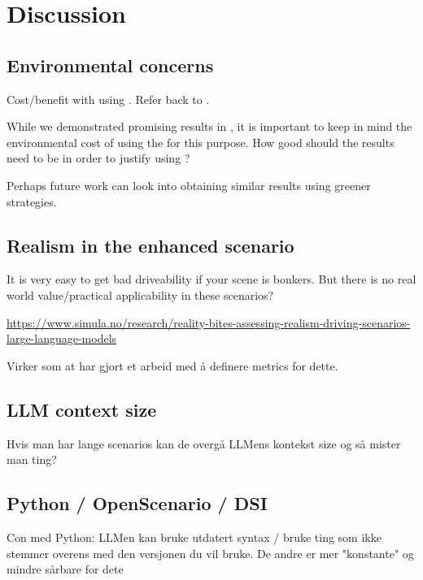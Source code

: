
\chapter{Discussion}
\section{Environmental concerns}
Cost/benefit with using . Refer back to .

While we demonstrated promising results in , it is important to keep in mind the
environmental cost of using the  for this purpose. How good should the results need
to be in order to justify using ?

Perhaps future work can look into obtaining similar results using greener strategies.

\section{Realism in the enhanced scenario}

It is very easy to get bad driveability if your scene is bonkers. But there is no real world
value/practical applicability in these scenarios?

\url{https://www.simula.no/research/reality-bites-assessing-realism-driving-scenarios-large-language-models}

Virker som at \cite{LLMScenarioChang24} har gjort et arbeid med å definere metrics for dette.


\section{LLM context size}

Hvis man har lange scenarios kan de overgå LLMens kontekst size og så mister man ting?

\section{Python / OpenScenario / DSI}

Con med Python: LLMen kan bruke utdatert syntax / bruke ting som ikke stemmer overens med den
versjonen du vil bruke. De andre er mer "konstante" og mindre sårbare for dete